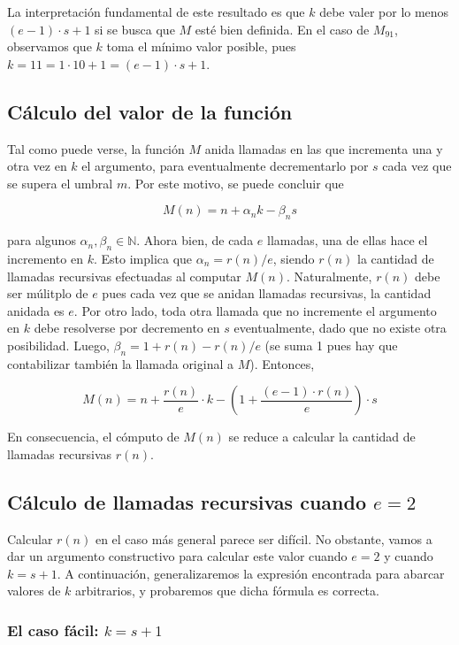 \documentclass[a4paper,10pt]{article}
\newcommand{\Nat}{\ensuremath{\mathbb{N}}}
\begin{document}
La interpretaci\'on fundamental de este resultado es que $k$ debe valer por lo menos $(e-1)\cdot s + 1$ si
se busca que $M$ est\'e bien definida. En el caso de $M_{91}$, observamos que $k$ toma el m\'inimo valor posible, pues
$k = 11 = 1 \cdot 10 + 1 = (e - 1) \cdot s + 1$.

\subsection{C\'alculo del valor de la funci\'on}

Tal como puede verse, la funci\'on $M$ anida llamadas en las que incrementa una y otra vez en $k$ el argumento, para
eventualmente decrementarlo por $s$ cada vez que se supera el umbral $m$. Por este motivo, se puede concluir que

$$M(n) = n + \alpha_n k - \beta_n s$$

para algunos $\alpha_n, \beta_n \in \Nat$. Ahora bien, de cada $e$ llamadas, una de ellas hace el incremento en $k$. Esto
implica que $\alpha_n = r(n) / e$, siendo $r(n)$ la cantidad de llamadas recursivas efectuadas al computar
$M(n)$. Naturalmente, $r(n)$ debe ser m\'ulitplo de $e$ pues cada vez que se anidan llamadas recursivas, la cantidad
anidada es $e$. Por otro lado, toda otra llamada que no incremente el argumento en $k$ debe resolverse
por decremento en $s$ eventualmente, dado que no existe otra posibilidad. Luego, $\beta_n = 1 + r(n) - r(n)/e$ (se
suma 1 pues hay que contabilizar tambi\'en la llamada original a $M$). Entonces,

$$M(n) = n + \frac{r(n)}{e} \cdot k - \left(1 + \frac{(e-1) \cdot r(n)}{e}\right) \cdot s$$

En consecuencia, el c\'omputo de $M(n)$ se reduce a calcular la cantidad de llamadas recursivas $r(n)$. 

\subsection{C\'alculo de llamadas recursivas cuando $e = 2$}

Calcular $r(n)$ en el caso m\'as general parece ser dif\'icil. No obstante, vamos a dar un argumento constructivo
para calcular este valor cuando $e = 2$ y cuando $k = s + 1$. A continuaci\'on, generalizaremos la expresi\'on
encontrada para abarcar valores de $k$ arbitrarios, y probaremos que dicha f\'ormula es correcta.

\subsubsection{El caso f\'acil: $k = s + 1$}
\end{document}
